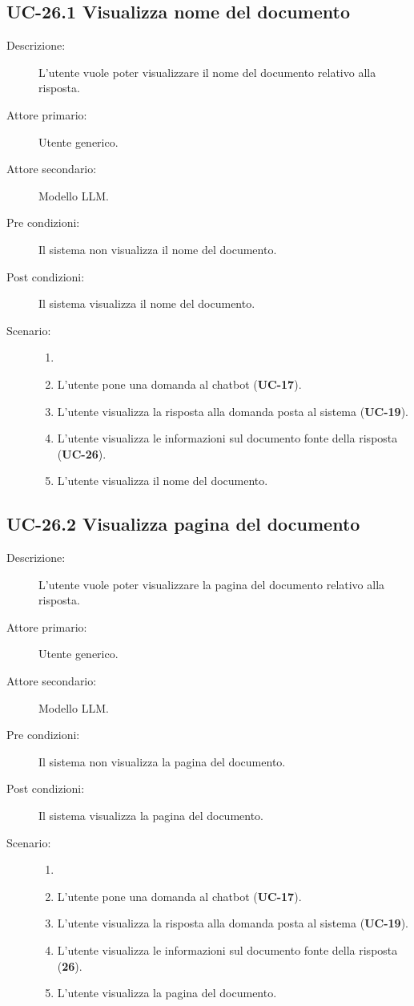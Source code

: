 \subsection{UC-26.1 Visualizza nome del documento}
\begin{description}
    \item[Descrizione:] L'utente vuole poter visualizzare il nome del documento relativo alla risposta.
    \item[Attore primario:] Utente generico.
    \item[Attore secondario:] Modello LLM.
    \item[Pre condizioni:] Il sistema non visualizza il nome del documento.
    \item[Post condizioni:] Il sistema visualizza il nome del documento.
    \item[Scenario:] 
    \begin{enumerate}
        \item[]
        \item L’utente pone una domanda al chatbot (\textbf{UC-17}).
        \item L'utente visualizza la risposta alla domanda posta al sistema (\textbf{UC-19}).
        \item L'utente visualizza le informazioni sul documento fonte della risposta (\textbf{UC-26}).
        \item L'utente visualizza il nome del documento.
    \end{enumerate}
\end{description}

\subsection{UC-26.2 Visualizza pagina del documento}
\begin{description}
    \item[Descrizione:] L'utente vuole poter visualizzare la pagina del documento relativo alla risposta.
    \item[Attore primario:] Utente generico.
    \item[Attore secondario:] Modello LLM.
    \item[Pre condizioni:] Il sistema non visualizza la pagina del documento.
    \item[Post condizioni:] Il sistema visualizza la pagina del documento.
    \item[Scenario:] 
    \begin{enumerate}
        \item[]
        \item L’utente pone una domanda al chatbot (\textbf{UC-17}).
        \item L'utente visualizza la risposta alla domanda posta al sistema (\textbf{UC-19}).
        \item L'utente visualizza le informazioni sul documento fonte della risposta (\textbf{26}).
        \item L'utente visualizza la pagina del documento.
    \end{enumerate}
\end{description}

